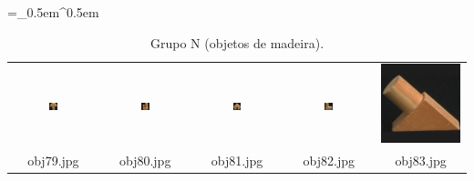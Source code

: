\begin{table}[H]
  \centering
  \caption{Grupo N (objetos de madeira).}
  \tabulinesep =_0.5em^0.5em
  \everyrow{\tabucline[0.4pt]-}
  \begin{tabu}{|ccccc|}
    \includegraphics[width=0.1\textwidth,height=0.1\textwidth]{imagens/coil_100/objetos_madeira/obj12__0.png} &
    \includegraphics[width=0.1\textwidth,height=0.1\textwidth]{imagens/coil_100/objetos_madeira/obj41__0.png} &
    \includegraphics[width=0.1\textwidth,height=0.1\textwidth]{imagens/coil_100/objetos_madeira/obj51__0.png} &
    \includegraphics[width=0.1\textwidth,height=0.1\textwidth]{imagens/coil_100/objetos_madeira/obj77__0.png} &
    \includegraphics[width=0.1\linewidth,height=0.1\linewidth]{imagens/coil_100/objetos_madeira/obj80__0.png}
    \\
    \scriptsize{obj79.jpg} & \scriptsize{obj80.jpg} & \scriptsize{obj81.jpg} &
    \scriptsize{obj82.jpg} & \scriptsize{obj83.jpg}
  \end{tabu}
\end{table}


